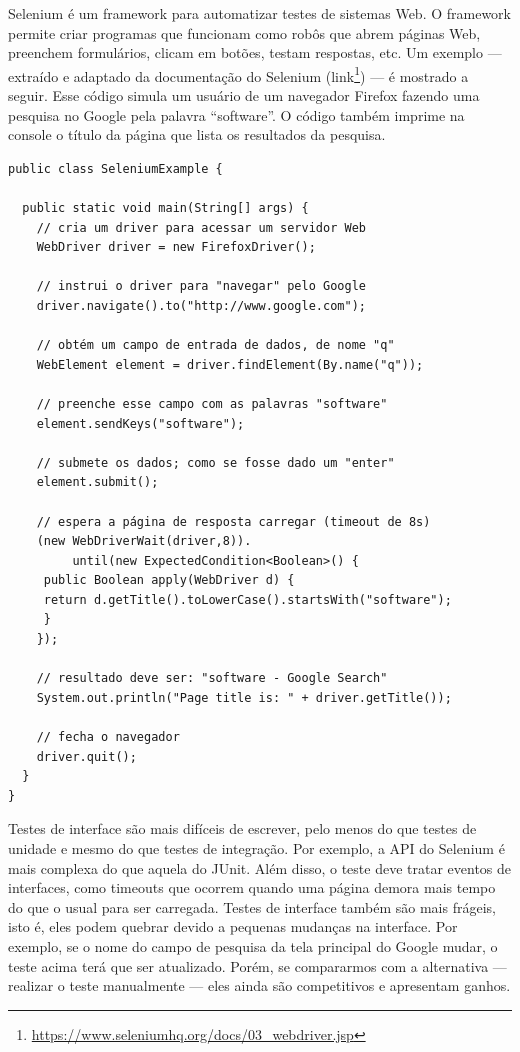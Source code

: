 \documentclass[
  11pt,
  twoside]{book}
\DeclareRobustCommand{\href}[2]{#2\footnote{\url{#1}}}
\begin{document}
 

Selenium é um framework para automatizar testes de sistemas Web. O
framework permite criar programas que funcionam como robôs que abrem
páginas Web, preenchem formulários, clicam em botões, testam respostas,
etc. Um exemplo --- extraído e adaptado da documentação do Selenium
(\href{https://www.seleniumhq.org/docs/03_webdriver.jsp}{link}) --- é
mostrado a seguir. Esse código simula um usuário de um navegador Firefox
fazendo uma pesquisa no Google pela palavra ``software''. O código
também imprime na console o título da página que lista os resultados da
pesquisa.

\begin{lstlisting}
public class SeleniumExample {

  public static void main(String[] args) {
    // cria um driver para acessar um servidor Web
    WebDriver driver = new FirefoxDriver();

    // instrui o driver para "navegar" pelo Google
    driver.navigate().to("http://www.google.com");

    // obtém um campo de entrada de dados, de nome "q"
    WebElement element = driver.findElement(By.name("q"));

    // preenche esse campo com as palavras "software"
    element.sendKeys("software");

    // submete os dados; como se fosse dado um "enter"
    element.submit();

    // espera a página de resposta carregar (timeout de 8s)
    (new WebDriverWait(driver,8)).
         until(new ExpectedCondition<Boolean>() {
     public Boolean apply(WebDriver d) {
     return d.getTitle().toLowerCase().startsWith("software");
     }
    });

    // resultado deve ser: "software - Google Search"
    System.out.println("Page title is: " + driver.getTitle());

    // fecha o navegador
    driver.quit();
  }
}
\end{lstlisting}

Testes de interface são mais difíceis de escrever, pelo menos do que
testes de unidade e mesmo do que testes de integração. Por exemplo, a
API do Selenium é mais complexa do que aquela do JUnit. Além disso, o
teste deve tratar eventos de interfaces, como timeouts que ocorrem
quando uma página demora mais tempo do que o usual para ser carregada.
Testes de interface também são mais frágeis, isto é, eles podem quebrar
devido a pequenas mudanças na interface. Por exemplo, se o nome do campo
de pesquisa da tela principal do Google mudar, o teste acima terá que
ser atualizado. Porém, se compararmos com a alternativa --- realizar o
teste manualmente --- eles ainda são competitivos e apresentam ganhos.
\end{document}
